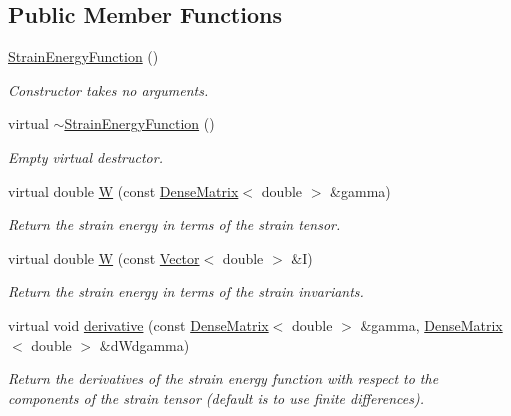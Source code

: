 \subsection*{Public Member Functions}
\begin{DoxyCompactItemize}
\item 
\hyperlink{classoomph_1_1StrainEnergyFunction_a027b9babcedcefb3fd06a6deace8f6b6}{Strain\+Energy\+Function} ()
\begin{DoxyCompactList}\small\item\em Constructor takes no arguments. \end{DoxyCompactList}\item 
virtual \hyperlink{classoomph_1_1StrainEnergyFunction_a755d306f96fc59147c6cb148456e364e}{$\sim$\+Strain\+Energy\+Function} ()
\begin{DoxyCompactList}\small\item\em Empty virtual destructor. \end{DoxyCompactList}\item 
virtual double \hyperlink{classoomph_1_1StrainEnergyFunction_a76cadaefaa89b93793c893f1302bd68a}{W} (const \hyperlink{classoomph_1_1DenseMatrix}{Dense\+Matrix}$<$ double $>$ \&gamma)
\begin{DoxyCompactList}\small\item\em Return the strain energy in terms of the strain tensor. \end{DoxyCompactList}\item 
virtual double \hyperlink{classoomph_1_1StrainEnergyFunction_a99df34610d4542568f65c568ae3a908f}{W} (const \hyperlink{classoomph_1_1Vector}{Vector}$<$ double $>$ \&I)
\begin{DoxyCompactList}\small\item\em Return the strain energy in terms of the strain invariants. \end{DoxyCompactList}\item 
virtual void \hyperlink{classoomph_1_1StrainEnergyFunction_a467a3b01986940aba8c8aff2715bf086}{derivative} (const \hyperlink{classoomph_1_1DenseMatrix}{Dense\+Matrix}$<$ double $>$ \&gamma, \hyperlink{classoomph_1_1DenseMatrix}{Dense\+Matrix}$<$ double $>$ \&d\+Wdgamma)
\begin{DoxyCompactList}\small\item\em Return the derivatives of the strain energy function with respect to the components of the strain tensor (default is to use finite differences). \end{DoxyCompactList}\item 

\end{DoxyCompactItemize}
